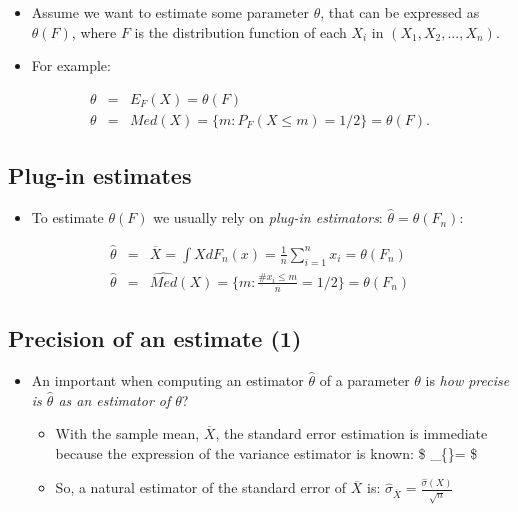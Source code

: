\documentclass[
  letterpaper,
  DIV=11,
  numbers=noendperiod]{scrartcl}
\providecommand{\tightlist}{%
  \setlength{\itemsep}{0pt}\setlength{\parskip}{0pt}}\usepackage{longtable,booktabs,array}
\begin{document}
\begin{itemize}
\tightlist
\item
  Assume we want to estimate some parameter \(\theta\), that can be
  expressed as \(\theta (F)\), where \(F\) is the distribution function
  of each \(X_i\) in \((X_1,X_2,...,X_n)\).
\item
  For example:
\end{itemize}

\begin{eqnarray*}
\theta &=& E_F(X)=\theta (F) \\
\theta &=& Med(X)=\{m:P_F(X\leq m)=1/2\}=
\theta (F).
\end{eqnarray*}

\hypertarget{plug-in-estimates}{%
\subsection{Plug-in estimates}\label{plug-in-estimates}}

\begin{itemize}
\tightlist
\item
  To estimate \(\theta(F)\) we usually rely on \emph{plug-in
  estimators}: \(\hat{\theta}=\theta (F_n)\):
\end{itemize}

\begin{eqnarray*}
\hat{\theta}&=&\overline{X}=\int XdF_n(x)=\frac
1n\sum_{i=1}^nx_i=\theta (F_n)
\\
\hat{\theta}&=&\widehat{Med}(X)=\{m:\frac{\#x_i\leq m}n=1/2\}=\theta
(F_n)
\end{eqnarray*}

\hypertarget{precision-of-an-estimate-1-1}{%
\subsection{Precision of an estimate
(1)}\label{precision-of-an-estimate-1-1}}

\begin{itemize}
\item
  An important when computing an estimator \(\hat \theta\) of a
  parameter \(\theta\) is \emph{how precise is \(\hat \theta\) as an
  estimator of \(\theta\)}?

  \begin{itemize}
  \tightlist
  \item
    With the sample mean, \(\overline{X}\), the standard error
    estimation is immediate because the expression of the variance
    estimator is known: \$
    \sigma \_\{\}= \$
  \item
    So, a natural estimator of the standard error of \(\overline{X}\)
    is: \(\hat\sigma_\overline{X}=\frac{\hat{\sigma}(X)}{\sqrt{n}}\)
  \end{itemize}
\end{itemize}
\end{document}
